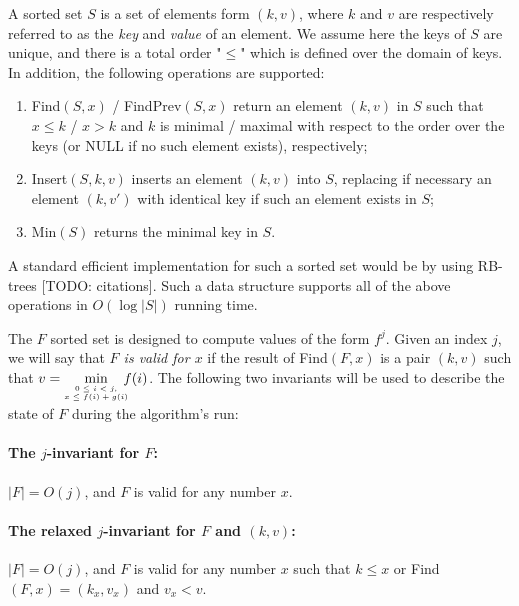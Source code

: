 A sorted set $S$ is a set of elements form $(k, v)$, where $k$ and $v$ are respectively referred to as the \emph{key} and \emph{value} of an element. We assume here the keys of $S$ are unique, and there is a total order "$\leq$" which is defined over the domain of keys.
In addition, the following operations are supported: 
\begin{enumerate}
	\item Find$(S, x)$ / FindPrev$(S, x)$ return an element $(k, v)$ in $S$ such that $x \leq k$ / $x > k$  and $k$ is minimal / maximal with respect to the order over the keys (or NULL if no such element exists), respectively;
	\item Insert$(S, k, v)$ inserts an element $(k, v)$ into $S$, replacing if necessary an element $(k, v')$ with identical key if such an element exists in $S$;
	\item Min$(S)$ returns the minimal key in $S$.
\end{enumerate}

A standard efficient implementation for such a sorted set would be by using RB-trees [TODO: citations]. Such a data structure supports all of the above operations in $O(\log |S|)$ running time.

The $F$ sorted set is designed to compute values of the form $f^j$.
Given an index $j$, we will say that \emph{$F$ is valid for $x$} if the result of Find$(F, x)$ is a pair $(k, v)$ such that $v = \hspace{-.5em}\min\limits_{{\tiny \begin{array}{c}
		0 \leq i < j, \\
		x \leq f(i) + g(i)
		\end{array}}} \hspace{-1em} f(i)$.
The following two invariants will be used to describe the state of $F$ during the algorithm's run:

\paragraph{The $j$-invariant for $F$:}
$|F| = O(j)$, and $F$ is valid for any number $x$.

\paragraph{The relaxed $j$-invariant for $F$ and $(k, v)$:}
$|F| = O(j)$, and $F$ is valid for any number $x$ such that $k \leq x$ or Find$(F, x) = (k_x, v_x)$ and $v_x < v$.
\bigskip

